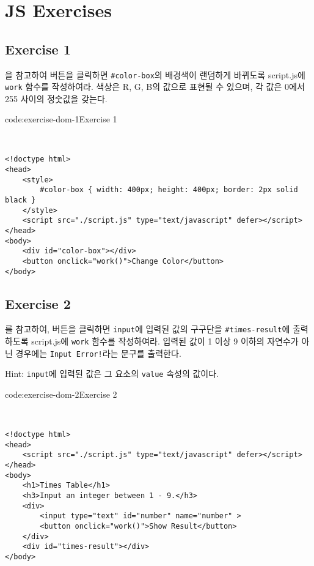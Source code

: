 \section{JS Exercises} \label{sect:js-exercises}

\subsection*{Exercise 1}

을 참고하여 버튼을 클릭하면 \texttt{\#color-box}의 배경색이 랜덤하게 바뀌도록 script.js에 \texttt{work} 함수를 작성하여라. 색상은 R, G, B의 값으로 표현될 수 있으며, 각 값은 0에서 255 사이의 정숫값을 갖는다.

\begin{codeenv}{code:exercise-dom-1}{Exercise 1}\begin{verbatim}


<!doctype html>
<head>
    <style>
        #color-box { width: 400px; height: 400px; border: 2px solid black }
    </style>
    <script src="./script.js" type="text/javascript" defer></script>
</head>
<body>
    <div id="color-box"></div>
    <button onclick="work()">Change Color</button>
</body>
\end{verbatim}
\end{codeenv}

\subsection*{Exercise 2}

를 참고하여, 버튼을 클릭하면 \texttt{input}에 입력된 값의 구구단을 \texttt{\#times-result}에 출력하도록 script.js에 \texttt{work} 함수를 작성하여라. 입력된 값이 1 이상 9 이하의 자연수가 아닌 경우에는 \texttt{Input Error!}라는 문구를 출력한다. 

Hint: \texttt{input}에 입력된 값은 그 요소의 \texttt{value} 속성의 값이다.

\begin{codeenv}{code:exercise-dom-2}{Exercise 2}\begin{verbatim}


<!doctype html>
<head>
    <script src="./script.js" type="text/javascript" defer></script>
</head>
<body>
    <h1>Times Table</h1>
    <h3>Input an integer between 1 - 9.</h3>
    <div>
        <input type="text" id="number" name="number" >
        <button onclick="work()">Show Result</button>
    </div>
    <div id="times-result"></div>
</body>
\end{verbatim}
\end{codeenv}

